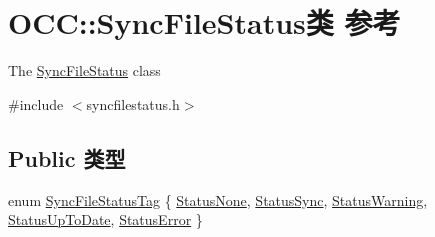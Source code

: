 \hypertarget{class_o_c_c_1_1_sync_file_status}{}\section{O\+CC\+:\+:Sync\+File\+Status类 参考}
\label{class_o_c_c_1_1_sync_file_status}


The \hyperlink{class_o_c_c_1_1_sync_file_status}{Sync\+File\+Status} class  




{\ttfamily \#include $<$syncfilestatus.\+h$>$}

\subsection*{Public 类型}
\begin{DoxyCompactItemize}
\item 
enum \hyperlink{class_o_c_c_1_1_sync_file_status_a036555392003d8becbbf4d18d49c358b}{Sync\+File\+Status\+Tag} \{ \newline
\hyperlink{class_o_c_c_1_1_sync_file_status_a036555392003d8becbbf4d18d49c358bab0960233ccd823c6874d7fdbe8eaa11d}{Status\+None}, 
\hyperlink{class_o_c_c_1_1_sync_file_status_a036555392003d8becbbf4d18d49c358ba2bd08cb2c724dd61d2196a3c43153829}{Status\+Sync}, 
\hyperlink{class_o_c_c_1_1_sync_file_status_a036555392003d8becbbf4d18d49c358baef4de648db70c7abf8efdb444f06efb8}{Status\+Warning}, 
\hyperlink{class_o_c_c_1_1_sync_file_status_a036555392003d8becbbf4d18d49c358ba9760fe879d0436ec6bd1008d46a9d936}{Status\+Up\+To\+Date}, 
\newline
\hyperlink{class_o_c_c_1_1_sync_file_status_a036555392003d8becbbf4d18d49c358bacc4fc86a51520edfdc3f92db48ab13de}{Status\+Error}
 \}
\end{DoxyCompactItemize}
